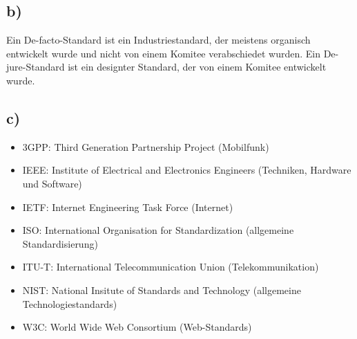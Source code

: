 \documentclass[a4paper,12pt]{scrartcl}
\begin{document}
\subsection{b)}
Ein De-facto-Standard ist ein Industriestandard, der meistens organisch
entwickelt wurde und nicht von einem Komitee verabschiedet wurden.
Ein De-jure-Standard ist ein designter Standard, der von einem Komitee
entwickelt wurde.

\subsection{c)}
\begin{itemize}
	\item 3GPP: Third Generation Partnership Project (Mobilfunk)
	\item IEEE: Institute of Electrical and Electronics Engineers (Techniken, Hardware und Software)
	\item IETF: Internet Engineering Task Force (Internet)
	\item ISO: International Organisation for Standardization (allgemeine Standardisierung)
	\item ITU-T: International Telecommunication Union (Telekommunikation)
	\item NIST: National Insitute of Standards and Technology (allgemeine Technologiestandards)
	\item W3C: World Wide Web Consortium (Web-Standards)
\end{itemize}
\end{document}
